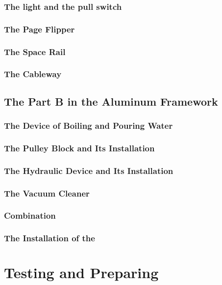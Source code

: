 \documentclass[a4paper]{refart}
\begin{document}
		\subsubsection{The light and the pull switch}
		\subsubsection{The Page Flipper}
			
		\subsubsection{The Space Rail}
		\subsubsection{The Cableway}
	\subsection{The Part B in the Aluminum Framework}
		\subsubsection{The Device of Boiling and Pouring Water}
		\subsubsection{The Pulley Block and Its Installation}
		\subsubsection{The Hydraulic Device and Its Installation}
		\subsubsection{The Vacuum Cleaner}
		\subsubsection{Combination}
		\subsubsection{The Installation of the}
\section{Testing and Preparing}
\newpage
		
\end{document}
